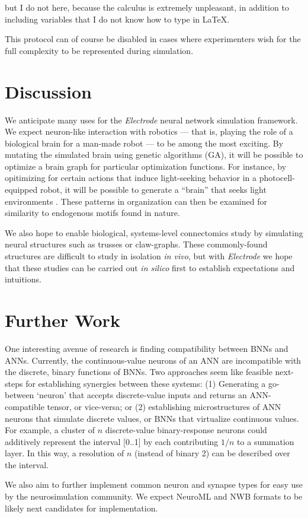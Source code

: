 \documentclass[letter, twocolumn]{article}
\begin{document}
but I do not here, because the calculus is extremely unpleasant, in addition to including variables that I do not know how to type in \LaTeX.

This protocol can of course be disabled in cases where experimenters wish for the full complexity to be represented during simulation.

\section{Discussion}
We anticipate many uses for the \textit{Electrode} neural network simulation framework. We expect neuron-like interaction with robotics --- that is, playing the role of a biological brain for a man-made robot --- to be among the most exciting. By mutating the simulated brain using genetic algorithms (GA), it will be possible to optimize a brain graph for particular optimization functions. For instance, by opitimizing for certain actions that induce light-seeking behavior in a photocell-equipped robot, it will be possible to generate a ``brain'' that seeks light environments \cite{celegansLight}. These patterns in organization can then be examined for similarity to endogenous motifs found in nature.

We also hope to enable biological, systems-level connectomics study by simulating neural structures such as trusses or claw-graphs. These commonly-found structures are difficult to study in isolation \textit{in vivo}, but with \textit{Electrode} we hope that these studies can be carried out \textit{in silico} first to establish expectations and intuitions.


\section{Further Work}
One interesting avenue of research is finding compatibility between BNNs and ANNs. Currently, the continuous-value neurons of an ANN are incompatible with the discrete, binary functions of BNNs. Two approaches seem like feasible next-steps for establishing synergies between these systems: (1) Generating a go-between `neuron' that accepts discrete-value inputs and returns an ANN-compatible tensor, or vice-versa; or (2) establishing microstructures of ANN neurons that simulate discrete values, or BNNs that virtualize continuous values. For example, a cluster of $n$ discrete-value binary-response neurons could additively represent the interval [0..1] by each contributing $1/n$ to a summation layer. In this way, a resolution of $n$ (instead of binary 2) can be described over the interval.

We also aim to further implement common neuron and synapse types for easy use by the neurosimulation community. We expect NeuroML and NWB formats to be likely next candidates for implementation.



\end{document}
